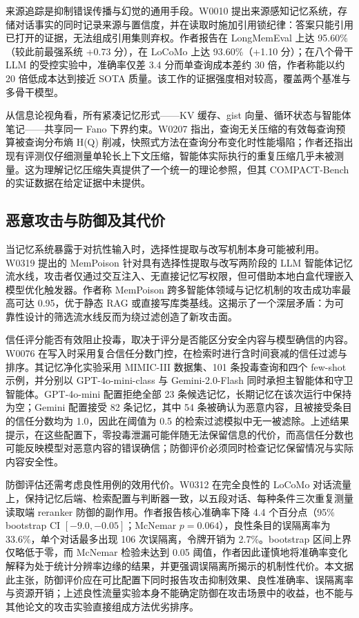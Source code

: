 来源追踪是抑制错误传播与幻觉的通用手段。W0010 提出来源感知记忆系统，存储对话事实的同时记录来源与置信度，并在读取时施加引用锁纪律：答案只能引用已打开的证据，无法组成引用集则弃权。作者报告在 LongMemEval 上达 95.60\%（较此前最强系统 +0.73 分），在 LoCoMo 上达 93.60\%（+1.10 分）；在八个骨干 LLM 的受控实验中，准确率仅差 3.4 分而单查询成本差约 30 倍，作者称能以约 20 倍低成本达到接近 SOTA 质量\cite{W0010}。该工作的证据强度相对较高，覆盖两个基准与多骨干模型。

从信息论视角看，所有紧凑记忆形式——KV 缓存、gist 向量、循环状态与智能体笔记——共享同一 Fano 下界约束。W0207 指出，查询无关压缩的有效每查询预算被查询分布熵 H(Q) 削减，快照式方法在查询分布变化时性能塌陷；作者还指出现有评测仅仔细测量单轮长上下文压缩，智能体实际执行的重复压缩几乎未被测量\cite{W0207}。这为理解记忆压缩失真提供了一个统一的理论参照，但其 COMPACT-Bench 的实证数据在给定证据中未提供。

\subsection{恶意攻击与防御及其代价}

当记忆系统暴露于对抗性输入时，选择性提取与改写机制本身可能被利用。W0319 提出的 MemPoison 针对具有选择性提取与改写两阶段的 LLM 智能体记忆流水线，攻击者仅通过交互注入、无直接记忆写权限，但可借助本地白盒代理嵌入模型优化触发器。作者称 MemPoison 跨多智能体领域与记忆机制的攻击成功率最高可达 0.95，优于静态 RAG 或直接写库类基线\cite{W0319}。这揭示了一个深层矛盾：为可靠性设计的筛选流水线反而为绕过滤创造了新攻击面。

信任评分能否有效阻止投毒，取决于评分是否能区分安全内容与模型确信的内容。W0076 在写入时采用复合信任分数门控，在检索时进行含时间衰减的信任过滤与排序。其记忆净化实验采用 MIMIC-III 数据集、101 条投毒查询和四个 few-shot 示例，并分别以 GPT-4o-mini-class 与 Gemini-2.0-Flash 同时承担主智能体和守卫智能体。GPT-4o-mini 配置拒绝全部 23 条候选记忆，长期记忆在该次运行中保持为空；Gemini 配置接受 82 条记忆，其中 54 条被确认为恶意内容，且被接受条目的信任分数均为 1.0，因此在阈值为 0.5 的检索过滤模拟中无一被滤除\cite{W0076}。上述结果提示，在这些配置下，零投毒泄漏可能伴随无法保留信息的代价，而高信任分数也可能反映模型对恶意内容的错误确信；防御评价必须同时检查记忆保留情况与实际内容安全性。

防御评估还需考虑良性用例的效用代价。W0312 在完全良性的 LoCoMo 对话流量上，保持记忆后端、检索配置与判断器一致，以五段对话、每种条件三次重复测量读取端 reranker 防御的副作用。作者报告核心准确率下降 4.4 个百分点（95\% bootstrap CI $[-9.0,-0.05]$；McNemar $p=0.064$），良性条目的误隔离率为 33.6\%，单个对话最多出现 106 次误隔离，令牌开销为 2.7\%\cite{W0312}。bootstrap 区间上界仅略低于零，而 McNemar 检验未达到 0.05 阈值，作者因此谨慎地将准确率变化解释为处于统计分辨率边缘的结果，并更强调误隔离所揭示的机制性代价\cite{W0312}。本文据此主张，防御评价应在可比配置下同时报告攻击抑制效果、良性准确率、误隔离率与资源开销；上述良性流量实验本身不能确定防御在攻击场景中的收益，也不能与其他论文的攻击实验直接组成方法优劣排序。


